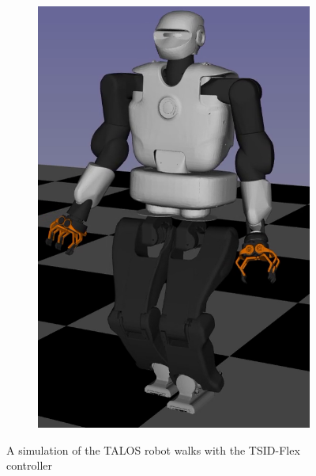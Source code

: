 \begin{figure}[t]
\begin{subfigure}[b]{0.32\textwidth}
        \includegraphics[width=\columnwidth]{chapter_flexible_joints/figures/talos_3.png}
    \end{subfigure}
    \caption{A simulation of the TALOS robot walks with the TSID-Flex controller~\label{fig:talos_flex_walking}}
\end{figure}
